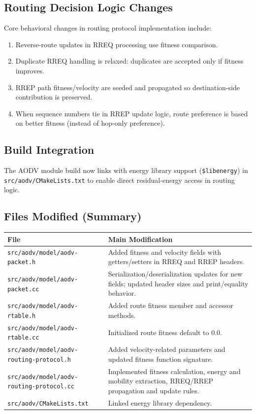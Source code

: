 \documentclass[12pt,a4paper]{article}
\begin{document}
\subsection{Routing Decision Logic Changes}
Core behavioral changes in routing protocol implementation include:
\begin{enumerate}[leftmargin=1.5em]
    \item Reverse-route updates in RREQ processing use fitness comparison.
    \item Duplicate RREQ handling is relaxed: duplicates are accepted only if fitness improves.
    \item RREP path fitness/velocity are seeded and propagated so destination-side contribution is preserved.
    \item When sequence numbers tie in RREP update logic, route preference is based on better fitness (instead of hop-only preference).
\end{enumerate}

\subsection{Build Integration}
The AODV module build now links with energy library support (\texttt{\${libenergy}}) in \texttt{src/aodv/CMakeLists.txt} to enable direct residual-energy access in routing logic.

\subsection{Files Modified (Summary)}
\begin{longtable}{p{}p{}}
\toprule
\textbf{File} & \textbf{Main Modification} \\
\midrule
\endhead
\texttt{src/aodv/model/aodv-packet.h} & Added fitness and velocity fields with getters/setters in RREQ and RREP headers. \\
\texttt{src/aodv/model/aodv-packet.cc} & Serialization/deserialization updates for new fields; updated header sizes and print/equality behavior. \\
\texttt{src/aodv/model/aodv-rtable.h} & Added route fitness member and accessor methods. \\
\texttt{src/aodv/model/aodv-rtable.cc} & Initialized route fitness default to 0.0. \\
\texttt{src/aodv/model/aodv-routing-protocol.h} & Added velocity-related parameters and updated fitness function signature. \\
\texttt{src/aodv/model/aodv-routing-protocol.cc} & Implemented fitness calculation, energy and mobility extraction, RREQ/RREP propagation and update rules. \\
\texttt{src/aodv/CMakeLists.txt} & Linked energy library dependency. \\
\bottomrule
\end{longtable}
\end{document}
